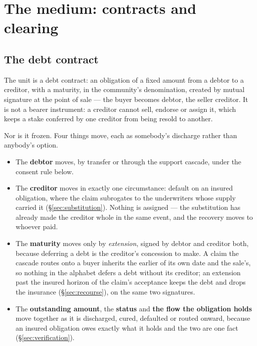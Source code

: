 \section{The medium: contracts and clearing}
\label{sec:medium}

\subsection{The debt contract}

The unit is a debt contract: an obligation of a fixed amount from a debtor to a
creditor, with a maturity, in the community's denomination, created by mutual signature
at the point of sale --- the buyer becomes debtor, the seller creditor. It is not a bearer
instrument: a creditor cannot sell, endorse or assign it, which keeps a stake conferred by
one creditor from being resold to another.

Nor is it frozen. Four things move, each as somebody's discharge rather than anybody's
option.

\begin{itemize}[leftmargin=1.4em]
  \item The \textbf{debtor} moves, by transfer or through the support cascade, under the
        consent rule below.
  \item The \textbf{creditor} moves in exactly one circumstance: default on an insured
        obligation, where the claim subrogates to the underwriters whose supply carried it
        (\S\ref{sec:substitution}). Nothing is assigned --- the substitution has already
        made the creditor whole in the same event, and the recovery moves to whoever paid.
  \item The \textbf{maturity} moves only by \emph{extension}, signed by debtor and creditor
        both, because deferring a debt is the creditor's concession to make. A claim the
        cascade routes onto a buyer inherits the earlier of its own date and the sale's, so
        nothing in the alphabet defers a debt without its creditor; an extension past the
        insured horizon of the claim's acceptance keeps the debt and drops the insurance
        (\S\ref{sec:recourse}), on the same two signatures.
  \item The \textbf{outstanding amount}, the \textbf{status} and \textbf{the flow the
        obligation holds} move together as it is discharged, cured, defaulted or routed
        onward, because an insured obligation owes exactly what it holds and the two are
        one fact (\S\ref{sec:verification}).
\end{itemize}

